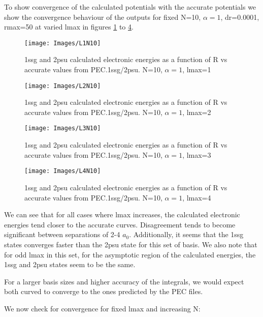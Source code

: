 \documentclass{article}
\begin{document}
To show convergence of the calculated potentials with the accurate potentials we show the convergence behaviour of the outputs for fixed N=10, $\alpha=1$, dr=0.0001, rmax=50 at varied lmax in figures \ref{L1N10} to \ref{L4N10}. 

\begin{figure}[H]
	\centering
	\texttt{[image: Images/L1N10]}\\
	\caption{1ssg and 2psu calculated electronic energies as a function of R vs accurate values from PEC.1ssg/2psu. N=10, $\alpha=1$, lmax=1}
	\label{L1N10}
\end{figure}
\begin{figure}[H]
	\centering
	\texttt{[image: Images/L2N10]}\\
	\caption{1ssg and 2psu calculated electronic energies as a function of R vs accurate values from PEC.1ssg/2psu. N=10, $\alpha=1$, lmax=2}
	\label{L2N10}
\end{figure}
\begin{figure}[H]
	\centering
	\texttt{[image: Images/L3N10]}\\
	\caption{1ssg and 2psu calculated electronic energies as a function of R vs accurate values from PEC.1ssg/2psu. N=10, $\alpha=1$, lmax=3}
	\label{L3N10}
\end{figure}
\begin{figure}[H]
	\centering
	\texttt{[image: Images/L4N10]}\\
	\caption{1ssg and 2psu calculated electronic energies as a function of R vs accurate values from PEC.1ssg/2psu. N=10, $\alpha=1$, lmax=4}
	\label{L4N10}
\end{figure}

We can see that for all cases where lmax increases, the calculated electronic energies tend closer to the accurate curves. Disagreement tends to become significant between separations of 2-4 $a_0$. Additionally, it seems that the 1ssg states converges faster than the 2psu state for this set of basis. We also note that for odd lmax in this set, for the asymptotic region of the calculated energies, the 1ssg and 2psu states seem to be the same. 

For a larger basis sizes and higher accuracy of the integrals, we would expect both curved to converge to the ones predicted by the PEC files.

We now check for convergence for fixed lmax and increasing N: 
\end{document}
